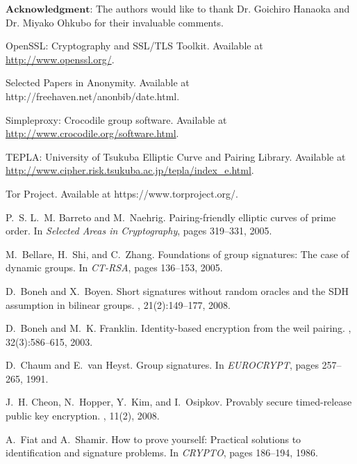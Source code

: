 \documentclass[preprint]{sig-alternate}
\begin{document}
\noindent$\mathbf{Acknowledgment}$: 
The authors would like to thank Dr. Goichiro Hanaoka and Dr. Miyako Ohkubo for their invaluable comments. 



\begin{thebibliography}{10}

{OpenSSL}: {C}ryptography and {SSL/TLS} {T}oolkit.
\newblock Available at \url{http://www.openssl.org/}.

{Selected Papers in Anonymity}.
\newblock Available at http://freehaven.net/anonbib/date.html.

{Simpleproxy}: Crocodile group software.
\newblock Available at \url{http://www.crocodile.org/software.html}.

{TEPLA}: {U}niversity of {T}sukuba {E}lliptic {C}urve and {P}airing {L}ibrary.
\newblock Available at
  \url{http://www.cipher.risk.tsukuba.ac.jp/tepla/index_e.html}.

{Tor Project}.
\newblock Available at https://www.torproject.org/.

\bibitem{[BarretoN05]}
P.~S. L.~M. Barreto and M.~Naehrig.
\newblock Pairing-friendly elliptic curves of prime order.
\newblock In {\em Selected Areas in Cryptography}, pages 319--331, 2005.

\bibitem{[BellareSZ05]}
M.~Bellare, H.~Shi, and C.~Zhang.
\newblock Foundations of group signatures: The case of dynamic groups.
\newblock In {\em CT-RSA}, pages 136--153, 2005.

\bibitem{[BonehB08]}
D.~Boneh and X.~Boyen.
\newblock Short signatures without random oracles and the {SDH} assumption in
  bilinear groups.
, 21(2):149--177, 2008.

\bibitem{[BonehF03]}
D.~Boneh and M.~K. Franklin.
\newblock Identity-based encryption from the weil pairing.
, 32(3):586--615, 2003.

\bibitem{[ChaumH91]}
D.~Chaum and E.~van Heyst.
\newblock Group signatures.
\newblock In {\em EUROCRYPT}, pages 257--265, 1991.

\bibitem{[CheonHKO08]}
J.~H. Cheon, N.~Hopper, Y.~Kim, and I.~Osipkov.
\newblock Provably secure timed-release public key encryption.
, 11(2), 2008.

\bibitem{[FiatS86]}
A.~Fiat and A.~Shamir.
\newblock How to prove yourself: Practical solutions to identification and
  signature problems.
\newblock In {\em CRYPTO}, pages 186--194, 1986.


\end{thebibliography}
\end{document}
